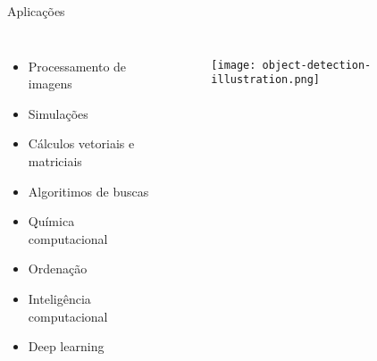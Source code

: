 \begin{frame}[t]{Aplicações}
    \begin{columns}
            \Large
            \begin{itemize}
                \item Processamento de imagens
                \item Simulações
                \item Cálculos vetoriais e matriciais
                \item Algoritimos de buscas
                \item Química computacional
                \item Ordenação
                \item Inteligência computacional
                \item Deep learning
            \end{itemize}
            \begin{figure}
                \texttt{[image: object-detection-illustration.png]}
            \end{figure}  
    \end{columns}
\end{frame}


       
          


